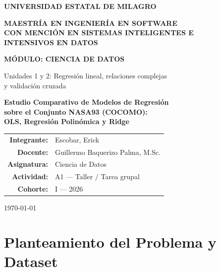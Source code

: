 \documentclass[11pt,a4paper]{article}
\begin{document}
\begin{titlepage}
    \centering
    \vspace*{1.5cm}
    {\Large\bfseries UNIVERSIDAD ESTATAL DE MILAGRO\par}
    \vspace{0.3cm}
    {\large\bfseries MAESTRÍA EN INGENIERÍA EN SOFTWARE\\
    CON MENCIÓN EN SISTEMAS INTELIGENTES E\\
    INTENSIVOS EN DATOS\par}
    \vspace{1.5cm}
    {\Large\bfseries MÓDULO: CIENCIA DE DATOS\par}
    \vspace{0.3cm}
    {\large Unidades 1 y 2: Regresión lineal, relaciones complejas\\
    y validación cruzada\par}
    \vspace{1.2cm}
    {\LARGE\bfseries Estudio Comparativo de Modelos de Regresión\\[0.3em]
    sobre el Conjunto NASA93 (COCOMO):\\[0.3em]
    OLS, Regresión Polinómica y Ridge\par}
    \vfill
    {\large
    \begin{tabular}{rl}
        \textbf{Integrante:}    & Escobar, Erick \\[0.4em]
        \textbf{Docente:}       & Guillermo Baquerizo Palma, M.Sc. \\[0.4em]
        \textbf{Asignatura:}    & Ciencia de Datos \\[0.4em]
        \textbf{Actividad:}     & A1 --- Taller / Tarea grupal \\[0.4em]
        \textbf{Cohorte:}       & I --- 2026 \\
    \end{tabular}\par}
    \vspace{1.5cm}
    {\large \today\par}
\end{titlepage}


\section{Planteamiento del Problema y Dataset}
\end{document}
